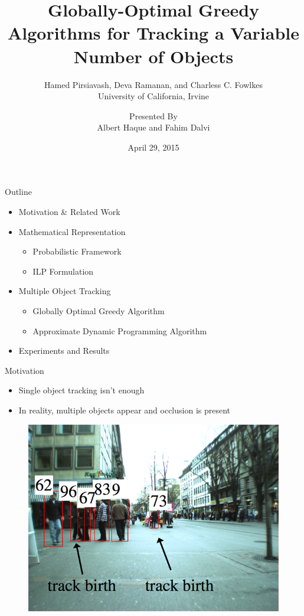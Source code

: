 \documentclass[aspectratio=43]{beamer}
\title[Stanford University]{Globally-Optimal Greedy Algorithms for Tracking a Variable Number of Objects}
\subtitle{\scriptsize \vspace{3mm}Hamed Pirsiavash, Deva Ramanan, and Charless C. Fowlkes\\University of California, Irvine\vspace{-3mm}}
\author[\enspace\,\,\, Albert Haque, Fahim Dalvi]{
		{\scriptsize Presented By}\\
		{\small Albert Haque and Fahim Dalvi}\\
		\vspace{-6mm}}
\institute[Stanford University]{}
\date{April 29, 2015}
\begin{document}
		
		\section{}%
		\begin{frame}
			\titlepage
		\end{frame}
		
		\begin{frame}{Outline}
			\begin{itemize}
				\item Motivation \& Related Work
				\item Mathematical Representation
				\begin{itemize}
					\item Probabilistic Framework
					\item ILP Formulation
				\end{itemize}
				\item Multiple Object Tracking
				\begin{itemize}
					\item Globally Optimal Greedy Algorithm
					\item Approximate Dynamic Programming Algorithm
				\end{itemize}
				\item Experiments and Results
			\end{itemize}
		\end{frame}
		
		\begin{frame}{Motivation}
			\begin{itemize}
				\item Single object tracking isn't enough
				\item In reality, multiple objects appear and occlusion is present
			\end{itemize}
			\begin{figure}
				\centering
				\includegraphics[width=0.5\linewidth]{figures/pull_new.png}
			\end{figure}
		\end{frame}
		
\end{document}
